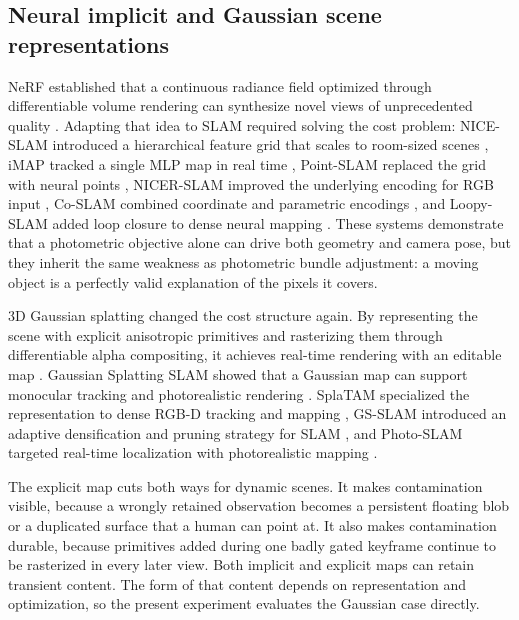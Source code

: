 \documentclass[10pt,conference]{IEEEtran}
\begin{document}
\subsection{Neural implicit and Gaussian scene representations}
NeRF established that a continuous radiance field optimized through differentiable volume rendering can synthesize novel views of unprecedented quality \cite{mildenhall2020nerf}. Adapting that idea to SLAM required solving the cost problem: NICE-SLAM introduced a hierarchical feature grid that scales to room-sized scenes \cite{zhu2022nice}, iMAP tracked a single MLP map in real time \cite{sucar2021imap}, Point-SLAM replaced the grid with neural points \cite{sandstrom2023pointslam}, NICER-SLAM improved the underlying encoding for RGB input \cite{zhu2024nicerslam}, Co-SLAM combined coordinate and parametric encodings \cite{wang2023coslam}, and Loopy-SLAM added loop closure to dense neural mapping \cite{yunus2024loopyslam}. These systems demonstrate that a photometric objective alone can drive both geometry and camera pose, but they inherit the same weakness as photometric bundle adjustment: a moving object is a perfectly valid explanation of the pixels it covers.

3D Gaussian splatting changed the cost structure again. By representing the scene with explicit anisotropic primitives and rasterizing them through differentiable alpha compositing, it achieves real-time rendering with an editable map \cite{kerbl2023}. Gaussian Splatting SLAM showed that a Gaussian map can support monocular tracking and photorealistic rendering \cite{matsuki2024}. SplaTAM specialized the representation to dense RGB-D tracking and mapping \cite{keetha2024splatam}, GS-SLAM introduced an adaptive densification and pruning strategy for SLAM \cite{yan2024gsslam}, and Photo-SLAM targeted real-time localization with photorealistic mapping \cite{huang2024photoslam}.

The explicit map cuts both ways for dynamic scenes. It makes contamination visible, because a wrongly retained observation becomes a persistent floating blob or a duplicated surface that a human can point at. It also makes contamination durable, because primitives added during one badly gated keyframe continue to be rasterized in every later view. Both implicit and explicit maps can retain transient content. The form of that content depends on representation and optimization, so the present experiment evaluates the Gaussian case directly.
\end{document}
